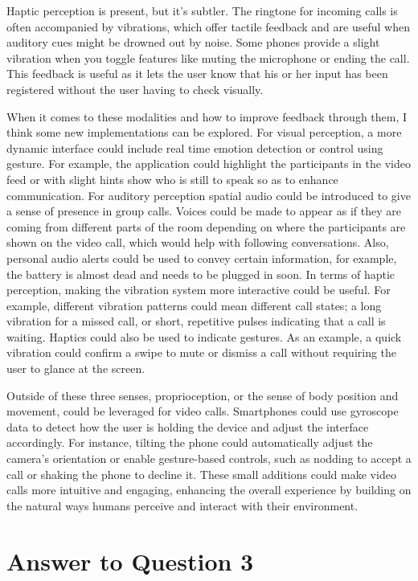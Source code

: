 \documentclass[
	letterpaper, %
]{jdf}
\begin{document}
Haptic perception is present, but it’s subtler. The ringtone for incoming calls is often accompanied by vibrations, which offer tactile feedback and are useful when auditory cues might be drowned out by noise. Some phones provide a slight vibration when you toggle features like muting the microphone or ending the call. This feedback is useful as it lets the user know that his or her input has been registered without the user having to check visually.

When it comes to these modalities and how to improve feedback through them, I think some new implementations can be explored. For visual perception, a more dynamic interface could include real time emotion detection or control using gesture. For example, the application could highlight the participants in the video feed or with slight hints show who is still to speak so as to enhance communication. For auditory perception spatial audio could be introduced to give a sense of presence in group calls. Voices could be made to appear as if they are coming from different parts of the room depending on where the participants are shown on the video call, which would help with following conversations. Also, personal audio alerts could be used to convey certain information, for example, the battery is almost dead and needs to be plugged in soon. In terms of haptic perception, making the vibration system more interactive could be useful. For example, different vibration patterns could mean different call states; a long vibration for a missed call, or short, repetitive pulses indicating that a call is waiting. Haptics could also be used to indicate gestures. As an example, a quick vibration could confirm a swipe to mute or dismiss a call without requiring the user to glance at the screen.

Outside of these three senses, proprioception, or the sense of body position and movement, could be leveraged for video calls. Smartphones could use gyroscope data to detect how the user is holding the device and adjust the interface accordingly. For instance, tilting the phone could automatically adjust the camera’s orientation or enable gesture-based controls, such as nodding to accept a call or shaking the phone to decline it. These small additions could make video calls more intuitive and engaging, enhancing the overall experience by building on the natural ways humans perceive and interact with their environment. 
\newpage

\section{Answer to Question 3}
\end{document}
